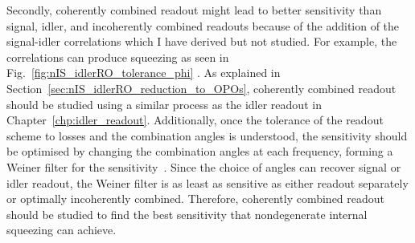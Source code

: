 Secondly, coherently combined readout might lead to better sensitivity than signal, idler, and incoherently combined readouts because of the addition of the signal-idler correlations which I have derived but not studied. For example, the correlations can produce squeezing as seen in Fig.~\ref{fig:nIS_idlerRO_tolerance_phi} . As explained in Section~\ref{sec:nIS_idlerRO_reduction_to_OPOs}, coherently combined readout should be studied using a similar process as the idler readout in Chapter~\ref{chp:idler_readout}. Additionally, once the tolerance of the readout scheme to losses and the combination angles is understood, the sensitivity should be optimised by changing the combination angles at each frequency, forming a Weiner filter for the sensitivity~\cite{}. Since the choice of angles can recover signal or idler readout, the Weiner filter is as least as sensitive as either readout separately or optimally incoherently combined. %
Therefore, coherently combined readout should be studied to find the best sensitivity that nondegenerate internal squeezing can achieve.

